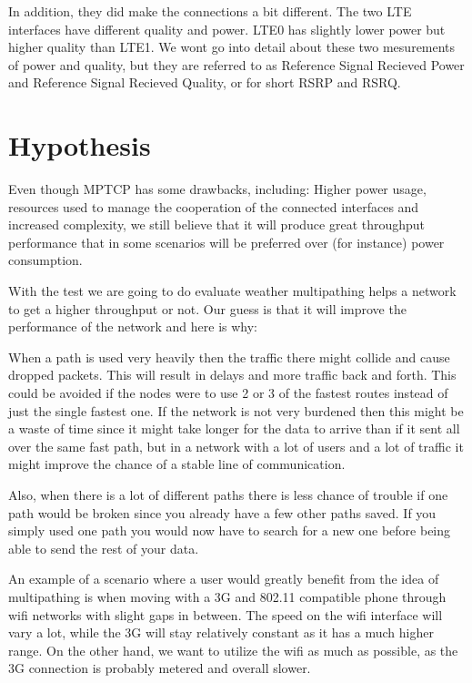 \documentclass[11pt,twocolumn]{article}
\begin{document}
In addition, they did make the connections a bit different. The two LTE interfaces have different quality and power. LTE0 has slightly lower power but higher quality than LTE1. We wont go into detail about these two mesurements of power and quality, but they are referred to as Reference Signal Recieved Power and Reference Signal Recieved Quality, or for short RSRP and RSRQ.


\section{Hypothesis}

Even though MPTCP has some drawbacks, including: Higher power usage, resources used to manage the cooperation of the connected interfaces and increased complexity, we still believe that it will produce great throughput performance that in some scenarios will be preferred over (for instance) power consumption.

With the test we are going to do evaluate weather multipathing helps a network to get a higher throughput or not. Our guess is that it will improve the performance of the network and here is why:

When a path is used very heavily then the traffic there might collide and cause dropped packets. This will result in delays and more traffic back and forth. This could be avoided if the nodes were to use 2 or 3 of the fastest routes instead of just the single fastest one. If the network is not very burdened then this might be a waste of time since it might take longer for the data to arrive than if it sent all over the same fast path, but in a network with a lot of users and a lot of traffic it might improve the chance of a stable line of communication.

Also, when there is a lot of different paths there is less chance of trouble if one path would be broken since you already have a few other paths saved. If you simply used one path you would now have to search for a new one before being able to send the rest of your data.

An example of a scenario where a user would greatly benefit from the idea of multipathing is when moving with a 3G and 802.11 compatible phone through wifi networks with slight gaps in between. The speed on the wifi interface will vary a lot, while the 3G will stay relatively constant as it has a much higher range. On the other hand, we want to utilize the wifi as much as possible, as the 3G connection is probably metered and overall slower.
\end{document}
